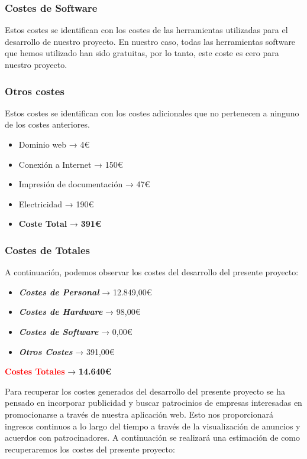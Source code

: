 \subsubsection{Costes de Software}

Estos costes se identifican con los costes de las herramientas utilizadas para el desarrollo de nuestro proyecto. En nuestro caso, todas las herramientas software que hemos utilizado han sido gratuitas, por lo tanto, este coste es cero para nuestro proyecto.

\subsubsection{Otros costes}

Estos costes se identifican con los costes adicionales que no pertenecen a ninguno de los costes anteriores.

\begin{itemize}
    \item Dominio web →   4€
    \item Conexión a Internet → 150€
    \item Impresión de documentación  →  47€
    \item Electricidad  → 190€
    \item  \textbf{Coste Total} → \textbf{391€}
\end{itemize}

\subsubsection{Costes de Totales}

A continuación, podemos observar los costes del desarrollo del presente proyecto: 

\begin{itemize}
    \item \textbf{\textit{Costes de Personal}} →  12.849,00€
    \item \textbf{\textit{Costes de Hardware}} → 98,00€
    \item \textbf{\textit{Costes de Software}}  → 0,00€
    \item \textbf{\textit{Otros Costes}}  → 391,00€
\end{itemize}
\textcolor{red}{\textbf{Costes Totales}} → \textbf{14.640€}

Para recuperar los costes generados del desarrollo del presente proyecto se ha pensado en incorporar publicidad y buscar patrocinios de empresas interesadas en promocionarse a través de nuestra aplicación web. Esto nos proporcionará ingresos continuos a lo largo del tiempo a través de la visualización de anuncios y acuerdos con patrocinadores. A continuación se realizará una estimación de como recuperaremos los costes del presente proyecto:

